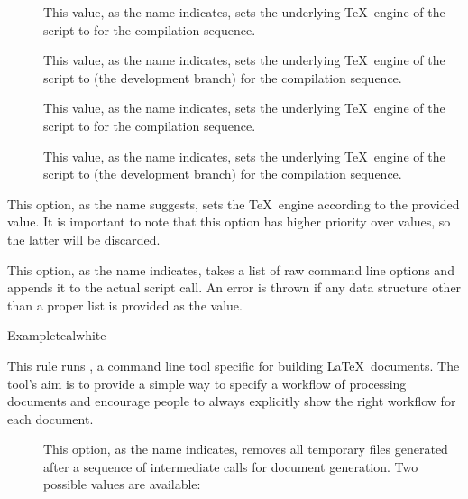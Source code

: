 \begin{description}
\begin{description}
\begin{description}
\item[] This value, as the name indicates, sets the underlying \TeX\ engine of the script to  for the compilation sequence.

\item[] This value, as the name indicates, sets the underlying \TeX\ engine of the script to  (the development branch) for the compilation sequence.

\item[] This value, as the name indicates, sets the underlying \TeX\ engine of the script to  for the compilation sequence.

\item[] This value, as the name indicates, sets the underlying \TeX\ engine of the script to  (the development branch) for the compilation sequence.
\end{description}

\item[\abox{program}] This option, as the name suggests, sets the \TeX\ engine according to the provided value. It is important to note that this option has higher priority over  values, so the latter will be discarded.

\item[\abox{options}] This option, as the name indicates, takes a list of raw command line options and appends it to the actual script call. An error is thrown if any data structure other than a proper list is provided as the value.
\end{description}

\begin{codebox}{Example}{teal}{\icnote}{white}
\end{codebox}

\item[\rulebox{llmk}]
This rule runs , a command line tool specific for building \LaTeX\ documents. The tool's aim is to provide a simple way to specify a workflow of processing documents and encourage people to always explicitly show the right workflow for each document.

\begin{description}
\item[] This option, as the name indicates, removes all temporary files generated after a sequence of intermediate calls for document generation. Two possible values are available:


\end{description}
\end{description}
